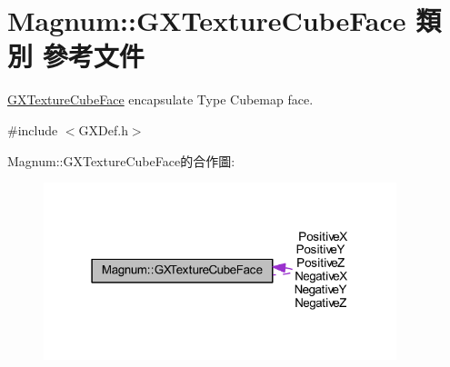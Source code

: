 \hypertarget{class_magnum_1_1_g_x_texture_cube_face}{}\section{Magnum\+:\+:G\+X\+Texture\+Cube\+Face 類別 參考文件}
\label{class_magnum_1_1_g_x_texture_cube_face}


\hyperlink{class_magnum_1_1_g_x_texture_cube_face}{G\+X\+Texture\+Cube\+Face} encapsulate Type Cubemap face.  




{\ttfamily \#include $<$G\+X\+Def.\+h$>$}



Magnum\+:\+:G\+X\+Texture\+Cube\+Face的合作圖\+:\nopagebreak
\begin{figure}[H]
\begin{center}
\leavevmode
\includegraphics[width=291pt]{class_magnum_1_1_g_x_texture_cube_face__coll__graph}
\end{center}
\end{figure}
